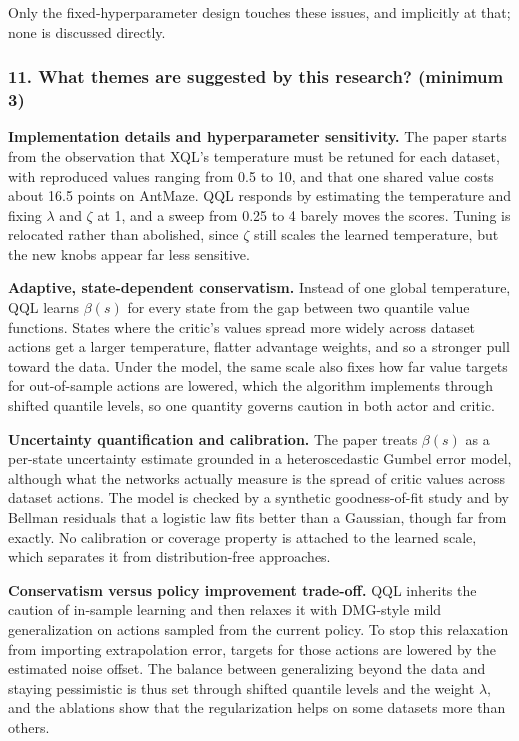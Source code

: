\documentclass[11pt]{article}
\newcommand{\question}[1]{\subsubsection*{#1}}
\begin{document}
Only the fixed-hyperparameter design touches these issues, and implicitly at that; none is discussed directly.

\question{11. What themes are suggested by this research? (minimum 3)}

\textbf{Implementation details and hyperparameter sensitivity.} The paper starts from the observation that XQL's temperature must be retuned for each dataset, with reproduced values ranging from 0.5 to 10, and that one shared value costs about 16.5 points on AntMaze. QQL responds by estimating the temperature and fixing \ensuremath{\lambda} and \ensuremath{\zeta} at 1, and a sweep from 0.25 to 4 barely moves the scores. Tuning is relocated rather than abolished, since \ensuremath{\zeta} still scales the learned temperature, but the new knobs appear far less sensitive.

\textbf{Adaptive, state-dependent conservatism.} Instead of one global temperature, QQL learns $\beta(s)$ for every state from the gap between two quantile value functions. States where the critic's values spread more widely across dataset actions get a larger temperature, flatter advantage weights, and so a stronger pull toward the data. Under the model, the same scale also fixes how far value targets for out-of-sample actions are lowered, which the algorithm implements through shifted quantile levels, so one quantity governs caution in both actor and critic.

\textbf{Uncertainty quantification and calibration.} The paper treats $\beta(s)$ as a per-state uncertainty estimate grounded in a heteroscedastic Gumbel error model, although what the networks actually measure is the spread of critic values across dataset actions. The model is checked by a synthetic goodness-of-fit study and by Bellman residuals that a logistic law fits better than a Gaussian, though far from exactly. No calibration or coverage property is attached to the learned scale, which separates it from distribution-free approaches.

\textbf{Conservatism versus policy improvement trade-off.} QQL inherits the caution of in-sample learning and then relaxes it with DMG-style mild generalization on actions sampled from the current policy. To stop this relaxation from importing extrapolation error, targets for those actions are lowered by the estimated noise offset. The balance between generalizing beyond the data and staying pessimistic is thus set through shifted quantile levels and the weight \ensuremath{\lambda}, and the ablations show that the regularization helps on some datasets more than others.
\end{document}
